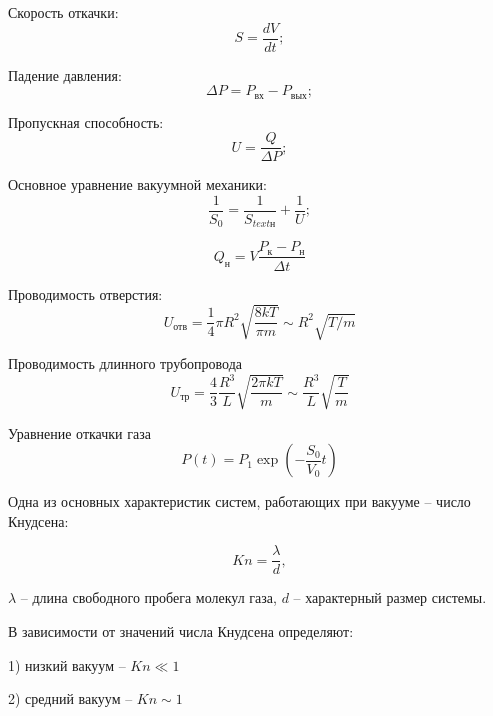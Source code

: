 \documentclass[a4paper, 12pt]{article}%
\begin{document}
	
	Скорость откачки:
	\begin{equation}
		S = \frac{dV}{dt};
	\end{equation}	
	
	Падение давления:
	\begin{equation}
		\Delta P = P_{\text{вх}} - P_{\text{вых}};
	\end{equation}
	
	Пропускная способность:
	\begin{equation}
		U = \frac{Q}{\Delta P};
	\end{equation}
	
	Основное уравнение вакуумной механики:
	\begin{equation}
		\frac{1}{S_{0}} = \frac{1}{S_{text{н}}} + \frac{1}{U};
	\end{equation} 
	
	\begin{equation}
		Q_{\text{н}} = V\frac{P_{\text{к}} - P_{\text{н}}}{\Delta t}		
	\end{equation}
	
	Проводимость отверстия:
	\begin{equation}
		U_{\text{отв}} = \frac{1}{4} \pi R^{2} \sqrt{\frac{8kT}{\pi m}} \sim R^{2}\sqrt{T/m}
	\end{equation}
	
	Проводимость длинного трубопровода
	\begin{equation}
		U_{\text{тр}} = \frac{4}{3} \frac{R^{3}}{L} \sqrt{\frac{2\pi kT}{m}} \sim \frac{R^{3}}{L} \sqrt{\frac{T}{m}} 
	\end{equation}
	
	Уравнение откачки газа
	\begin{equation}
		P\left( t \right) = P_{1}\exp \left(- \frac{S_{0}}{V_{0}}t \right)
	\end{equation}
	
	
	Одна из основных характеристик систем, работающих при вакууме -- число Кнудсена:
	
	\begin{equation}
		Kn = \frac{\lambda}{d}, 
	\end{equation}
	
	$\lambda$ -- длина свободного пробега молекул газа, $d$ -- характерный размер системы.
	
	В зависимости от значений числа Кнудсена определяют:
	
	1) низкий вакуум -- $Kn \ll 1$
	
	2) средний вакуум -- $Kn \sim 1$
	
\end{document}
